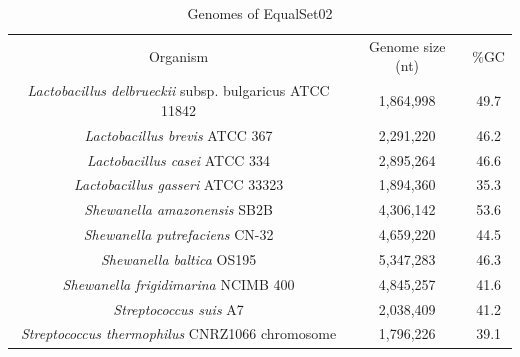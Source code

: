 \documentclass[twocolumn]{bmcart}%
\begin{document}
\begin{table}
	\centering
	\caption{Genomes of EqualSet02 \cite{Laczny2014}}
	\begin{tabular}{ccc}
		Organism&Genome size (nt)&\%GC\\
		\textit{Lactobacillus delbrueckii} subsp.  bulgaricus ATCC 11842&1,864,998&49.7\\
		\textit{Lactobacillus brevis} ATCC 367&2,291,220&46.2\\
		\textit{Lactobacillus casei} ATCC 334&2,895,264&46.6\\
		\textit{Lactobacillus gasseri}	ATCC 33323&1,894,360&35.3\\
		\textit{Shewanella amazonensis}	SB2B&4,306,142&53.6\\
		\textit{Shewanella putrefaciens} CN-32&4,659,220&44.5\\
		\textit{Shewanella baltica}	OS195&5,347,283&46.3\\
		\textit{Shewanella frigidimarina}	NCIMB 400&4,845,257&41.6\\
		\textit{Streptococcus suis}	A7&2,038,409&41.2\\
		\textit{Streptococcus thermophilus}	CNRZ1066 chromosome&1,796,226&39.1
	\end{tabular}
\label{tab:eqgenomes}
\end{table}
\end{document}

